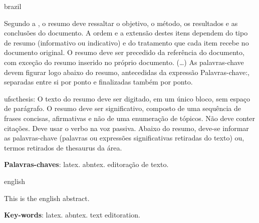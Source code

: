 %
\begin{otherlanguage*}{brazil}
\begin{resumo}

    Segundo a , o resumo deve ressaltar o
    objetivo, o método, os resultados e as conclusões do documento. A ordem e a extensão
    destes itens dependem do tipo de resumo (informativo ou indicativo) e do
    tratamento que cada item recebe no documento original. O resumo deve ser
    precedido da referência do documento, com exceção do resumo inserido no
    próprio documento. (\ldots) As palavras-chave devem figurar logo abaixo do
    resumo, antecedidas da expressão Palavras-chave:, separadas entre si por
    ponto e finalizadas também por ponto.

    ufscthesis: O texto do resumo deve ser digitado, em um único bloco, sem espaço de parágrafo. O resumo deve
    ser significativo, composto de uma sequência de frases concisas, afirmativas e não de uma
    enumeração de tópicos. Não deve conter citações. Deve usar o verbo na voz passiva. Abaixo do
    resumo, deve-se informar as palavras-chave (palavras ou expressões significativas retiradas do
    texto) ou, termos retirados de thesaurus da área. \showfont

\vspace{\onelineskip}
\textbf{Palavras-chaves}: latex. abntex. editoração de texto.

\end{resumo}
\end{otherlanguage*}


\begin{otherlanguage*}{english}
\begin{resumo}[Abstract]

    This is the english abstract.

    \vspace{\onelineskip}
    \noindent\textbf{Key-words}: latex. abntex. text editoration.

\end{resumo}
\end{otherlanguage*}


